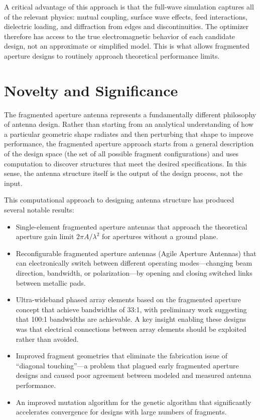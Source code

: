 A critical advantage of this approach is that the full-wave simulation captures all of the relevant physics: mutual coupling, surface wave effects, feed interactions, dielectric loading, and diffraction from edges and discontinuities.  The optimizer therefore has access to the true electromagnetic behavior of each candidate design, not an approximate or simplified model.  This is what allows fragmented aperture designs to routinely approach theoretical performance limits.

\section{Novelty and Significance}

The fragmented aperture antenna represents a fundamentally different philosophy of antenna design.  Rather than starting from an analytical understanding of how a particular geometric shape radiates and then perturbing that shape to improve performance, the fragmented aperture approach starts from a general description of the design space (the set of all possible fragment configurations) and uses computation to discover structures that meet the desired specifications.  In this sense, the antenna structure itself is the output of the design process, not the input.

This computational approach to designing antenna structure has produced several notable results:

\begin{itemize}
\item Single-element fragmented aperture antennas that approach the theoretical aperture gain limit $2\pi A / \lambda^2$ for apertures without a ground plane.

\item Reconfigurable fragmented aperture antennas (Agile Aperture Antennas) that can electronically switch between different operating modes---changing beam direction, bandwidth, or polarization---by opening and closing switched links between metallic pads.

\item Ultra-wideband phased array elements based on the fragmented aperture concept that achieve bandwidths of 33:1, with preliminary work suggesting that 100:1 bandwidths are achievable.  A key insight enabling these designs was that electrical connections between array elements should be exploited rather than avoided.

\item Improved fragment geometries that eliminate the fabrication issue of ``diagonal touching''---a problem that plagued early fragmented aperture designs and caused poor agreement between modeled and measured antenna performance.

\item An improved mutation algorithm for the genetic algorithm that significantly accelerates convergence for designs with large numbers of fragments.
\end{itemize}

